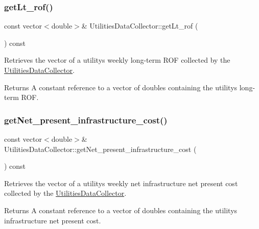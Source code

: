 \subsubsection{\texorpdfstring{get\+Lt\+\_\+rof()}{getLt\_rof()}}
{\footnotesize\ttfamily const vector$<$double$>$\& Utilities\+Data\+Collector\+::get\+Lt\+\_\+rof (\begin{DoxyParamCaption}{ }\end{DoxyParamCaption}) const}



Retrieves the vector of a utility\textquotesingle{}s weekly long-\/term R\+OF collected by the {\ttfamily \mbox{\hyperlink{classUtilitiesDataCollector}{Utilities\+Data\+Collector}}}. 

\begin{DoxyReturn}{Returns}
A constant reference to a vector of doubles containing the utility\textquotesingle{}s long-\/term R\+OF. 
\end{DoxyReturn}
\mbox{\label{classUtilitiesDataCollector_a90a0dbf95c1eaf8325c3703764408f84}} 
\subsubsection{\texorpdfstring{get\+Net\+\_\+present\+\_\+infrastructure\+\_\+cost()}{getNet\_present\_infrastructure\_cost()}}
{\footnotesize\ttfamily const vector$<$double$>$\& Utilities\+Data\+Collector\+::get\+Net\+\_\+present\+\_\+infrastructure\+\_\+cost (\begin{DoxyParamCaption}{ }\end{DoxyParamCaption}) const}



Retrieves the vector of a utility\textquotesingle{}s weekly net infrastructure net present cost collected by the {\ttfamily \mbox{\hyperlink{classUtilitiesDataCollector}{Utilities\+Data\+Collector}}}. 

\begin{DoxyReturn}{Returns}
A constant reference to a vector of doubles containing the utility\textquotesingle{}s infrastructure net present cost. 
\end{DoxyReturn}
\mbox{\label{classUtilitiesDataCollector_a0e09af9bbb446c502c0d10be477dcf00}} 
